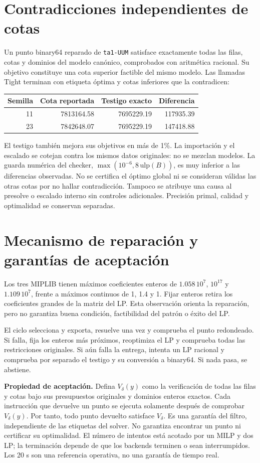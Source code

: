 \documentclass[10pt,a4paper]{article}
\begin{document}
\section*{Contradicciones independientes de cotas}
Un punto binary64 reparado de \texttt{ta1-UUM} satisface exactamente todas
las filas, cotas y dominios del modelo canónico, comprobados con aritmética
racional. Su objetivo constituye una cota superior factible del mismo
modelo. Las llamadas Tight terminan con etiqueta óptima y cotas inferiores
que la contradicen:
\begin{center}\small
\begin{tabular}{@{}rrrr@{}}\toprule
Semilla & Cota reportada & Testigo exacto & Diferencia\\\midrule
11 & 7813164.58 & 7695229.19 & 117935.39\\
23 & 7842648.07 & 7695229.19 & 147418.88\\
\bottomrule\end{tabular}\end{center}
El testigo también mejora sus objetivos en más de 1\%. La importación y
el escalado se cotejan contra los mismos datos originales: no se mezclan
modelos. La guarda numérica del checker, $\max(10^{-6},8\,\mathrm{ulp}(B))$,
es muy inferior a las diferencias observadas. No se certifica el óptimo
global ni se consideran válidas las otras cotas por no hallar contradicción.
Tampoco se atribuye una causa al presolve o escalado interno sin controles
adicionales. Precisión primal, calidad y optimalidad se conservan separadas.
\newpage
\section*{Mecanismo de reparación y garantías de aceptación}
Los tres MIPLIB tienen máximos coeficientes enteros de $1.058\,10^7$,
$10^{17}$ y $1.109\,10^7$, frente a máximos continuos de 1, 1.4 y 1.
Fijar enteros retira los coeficientes grandes de la matriz del LP. Esta
observación orienta la reparación, pero no garantiza buena condición,
factibilidad del patrón o éxito del LP.

El ciclo selecciona y exporta, resuelve una vez y comprueba el punto
redondeado. Si falla, fija los enteros más próximos, reoptimiza el LP y
comprueba todas las restricciones originales. Si aún falla la entrega,
intenta un LP racional y comprueba por separado el testigo y su conversión
a binary64. Si nada pasa, se abstiene.

\textbf{Propiedad de aceptación.} Defina $V_\delta(y)$ como la verificación
de todas las filas y cotas bajo sus presupuestos originales y dominios
enteros exactos. Cada instrucción que devuelve un punto se ejecuta solamente
después de comprobar $V_\delta(y)$. Por tanto, todo punto devuelto satisface
$V_\delta$. Es una garantía del filtro, independiente de las etiquetas
del solver. No garantiza encontrar un punto ni certificar su optimalidad.
El número de intentos está acotado por un MILP y dos LP; la terminación
depende de que los backends terminen o sean interrumpidos. Los 20 s son
una referencia operativa, no una garantía de tiempo real.
\end{document}
